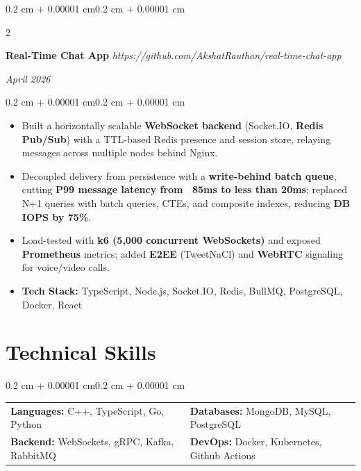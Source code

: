 \documentclass[10pt, letterpaper]{article}
\newenvironment{highlights}{
    \begin{itemize}[
        topsep=0.06 cm,
        parsep=0.06 cm,
        partopsep=0pt,
        itemsep=0pt,
        leftmargin=0.4 cm + 10pt
    ]
}{
    \end{itemize}
}
\newenvironment{onecolentry}{
    \begin{adjustwidth}{0.2 cm + 0.00001 cm}{0.2 cm + 0.00001 cm}
}{
    \end{adjustwidth}
}
\newenvironment{twocolentry}[2][]{
    \onecolentry
    \def\secondColumn{#2}
    \setcolumnwidth{\fill, 4.5 cm}
    \begin{paracol}{2}
}{
    \switchcolumn \raggedleft \secondColumn
    \end{paracol}
    \endonecolentry
}
\begin{document}
    \begin{twocolentry}{\textit{April 2026}}
        \textbf{Real-Time Chat App} \quad
        \textit{https://github.com/AkshatRauthan/real-time-chat-app}
    \end{twocolentry}
    \vspace{0.10 cm}
    \begin{onecolentry}
        \begin{highlights}
            \item Built a horizontally scalable \textbf{WebSocket backend} (Socket.IO, \textbf{Redis Pub/Sub}) with a TTL-based Redis presence and session store, 
                relaying messages across multiple nodes behind Nginx.
            \item Decoupled delivery from persistence with a \textbf{write-behind batch queue}, cutting \textbf{P99 message latency from ~85ms to less than 20ms}; replaced 
                N+1 queries with batch queries, CTEs, and composite indexes, reducing \textbf{DB IOPS by 75\%}.
            \item Load-tested with \textbf{k6 (5,000 concurrent WebSockets)} and exposed \textbf{Prometheus} metrics; added \textbf{E2EE} (TweetNaCl) and 
                \textbf{WebRTC} signaling for voice/video calls.
            \item \textbf{Tech Stack:} TypeScript, Node.js, Socket.IO, Redis, BullMQ, PostgreSQL, Docker, React
        \end{highlights}
    \end{onecolentry}



\section{Technical Skills}

    \begin{onecolentry}
        \renewcommand{\arraystretch}{1.2}
        \begin{tabularx}{\textwidth}{@{} X X @{}}
            \textbf{Languages:} C++, TypeScript, Go, Python 
            & 
            \textbf{Databases:} MongoDB, MySQL, PostgreSQL \\
            
            
            \textbf{Backend:} WebSockets, gRPC, Kafka, RabbitMQ
            &
            \textbf{DevOps:} Docker, Kubernetes, Github Actions \\
        \end{tabularx}
    \end{onecolentry}
\vspace{0.1cm}
\end{document}

